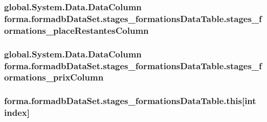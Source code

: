 \subsubsection[{\texorpdfstring{stages\+\_\+formations\+\_\+place\+Restantes\+Column}{stages_formations_placeRestantesColumn}}]{\setlength{\rightskip}{0pt plus 5cm}global.\+System.\+Data.\+Data\+Column forma.\+formadb\+Data\+Set.\+stages\+\_\+formations\+Data\+Table.\+stages\+\_\+formations\+\_\+place\+Restantes\+Column\hspace{0.3cm}{\ttfamily [get]}}\hypertarget{classforma_1_1formadb_data_set_1_1stages__formations_data_table_ad47d6b93b612e666d6e763a8a00b0c77}{}\label{classforma_1_1formadb_data_set_1_1stages__formations_data_table_ad47d6b93b612e666d6e763a8a00b0c77}
\subsubsection[{\texorpdfstring{stages\+\_\+formations\+\_\+prix\+Column}{stages_formations_prixColumn}}]{\setlength{\rightskip}{0pt plus 5cm}global.\+System.\+Data.\+Data\+Column forma.\+formadb\+Data\+Set.\+stages\+\_\+formations\+Data\+Table.\+stages\+\_\+formations\+\_\+prix\+Column\hspace{0.3cm}{\ttfamily [get]}}\hypertarget{classforma_1_1formadb_data_set_1_1stages__formations_data_table_a9c94b00f6816317a6dd6e6237107aaf2}{}\label{classforma_1_1formadb_data_set_1_1stages__formations_data_table_a9c94b00f6816317a6dd6e6237107aaf2}
\subsubsection[{\texorpdfstring{this[int index]}{this[int index]}}]{ forma.\+formadb\+Data\+Set.\+stages\+\_\+formations\+Data\+Table.\+this\mbox{[}int index\mbox{]}\hspace{0.3cm}{\ttfamily [get]}}\hypertarget{classforma_1_1formadb_data_set_1_1stages__formations_data_table_ad70f26f9ebf4e04bb1ef1fff4503235f}{}\label{classforma_1_1formadb_data_set_1_1stages__formations_data_table_ad70f26f9ebf4e04bb1ef1fff4503235f}


